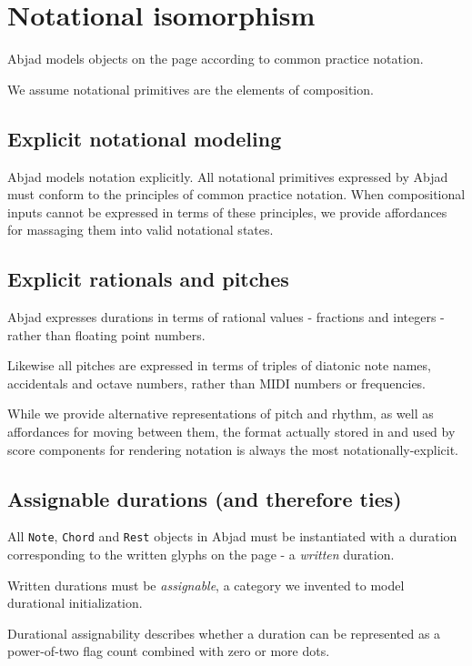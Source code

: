 \section{Notational isomorphism}\label{sec:notational_isomorphism}

Abjad models objects on the page according to common practice notation.

We assume notational primitives are the elements of composition.

\subsection{Explicit notational modeling}

Abjad models notation explicitly. All notational primitives expressed by Abjad
must conform to the principles of common practice notation. When compositional
inputs cannot be expressed in terms of these principles, we provide affordances
for massaging them into valid notational states.

\subsection{Explicit rationals and pitches}

Abjad expresses durations in terms of rational values - fractions and integers
- rather than floating point numbers.

Likewise all pitches are expressed in terms of triples of diatonic note names,
accidentals and octave numbers, rather than MIDI numbers or frequencies.

While we provide alternative representations of pitch and rhythm, as well as
affordances for moving between them, the format actually stored in and used by
score components for rendering notation is always the most
notationally-explicit.

\subsection{Assignable durations (and therefore ties)}

All \texttt{Note}, \texttt{Chord} and \texttt{Rest} objects in Abjad must be
instantiated with a duration corresponding to the written glyphs on the page -
a \emph{written} duration.

Written durations must be \emph{assignable}, a category we invented to model
durational initialization.

Durational assignability describes whether a duration can be represented as a
power-of-two flag count combined with zero or more dots.

